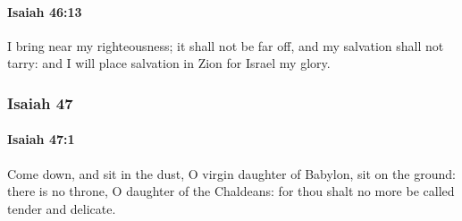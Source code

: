 		\paragraph{Isaiah 46:13} %
			\label{ISAIAH-46-13}

			I bring near my righteousness; it shall not be far off, and my salvation shall not tarry: and I will place salvation in Zion for Israel my glory.

	\subsubsection{Isaiah 47} %
		\label{ISAIAH-47}

		\paragraph{Isaiah 47:1} %
			\label{ISAIAH-47-1}

			Come down, and sit in the dust, O virgin daughter of Babylon, sit on the ground: there is no throne, O daughter of the Chaldeans: for thou shalt no more be called tender and delicate.

